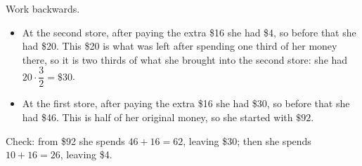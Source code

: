 Work backwards.
\begin{itemize}
\item At the second store, after paying the extra \$16 she had \$4, so before that she had \$20. This \$20 is what was left after spending one third of her money there, so it is two thirds of what she brought into the second store: she had $20\cdot\dfrac{3}{2}=\$30$.
\item At the first store, after paying the extra \$16 she had \$30, so before that she had \$46. This is half of her original money, so she started with $\boxed{\$92}$.
\end{itemize}
Check: from \$92 she spends $46+16=62$, leaving \$30; then she spends $10+16=26$, leaving \$4.
